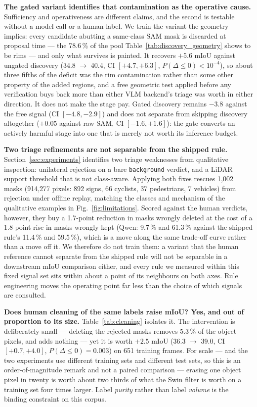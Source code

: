 \documentclass[conference]{IEEEtran}
\begin{document}
\textbf{The gated variant identifies that contamination as the operative cause.}
Sufficiency and operativeness are different claims, and the second is testable without a model call
or a human label. We train the variant the geometry implies: every candidate abutting a same-class
SAM mask is discarded at proposal time --- the 78.6\,\% of the pool Table~\ref{tab:discovery_geometry}
shows to be rims --- and only what survives is painted.
It recovers $+5.6$ mIoU against ungated discovery (34.8 $\to$ 40.4, CI $[+4.7, +6.3]$,
$P(\Delta\leq0)<10^{-4}$), so about three fifths of the deficit was the rim contamination rather than
some other property of the added regions, and a free geometric test applied before any verification
buys back more than either VLM backend's triage was worth in either direction.
It does not make the stage pay. Gated discovery remains $-3.8$ against the free signal
(CI $[-4.8, -2.9]$) and does not separate from skipping discovery altogether ($+0.05$ against raw
SAM, CI $[-1.6, +1.6]$): the gate converts an actively harmful stage into one that is merely not
worth its inference budget.



\textbf{Two triage refinements are not separable from the shipped rule.}
Section~\ref{sec:experiments} identifies two triage weaknesses from qualitative inspection: unilateral
rejection on a bare \texttt{background} verdict, and a LiDAR support threshold that is not class-aware.
Applying both fixes rescues 1{,}002 masks (914{,}277 pixels: 892 signs, 66 cyclists, 37 pedestrians,
7 vehicles) from rejection under offline replay, matching the classes and mechanism of the qualitative
examples in Fig.~\ref{fig:limitations}. Scored against the human verdicts, however, they buy a
1.7-point reduction in masks wrongly deleted at the cost of a 1.8-point rise in masks wrongly kept
(Qwen: 9.7\,\% and 61.3\,\% against the shipped rule's 11.4\,\% and 59.5\,\%), which is a move along
the same trade-off curve rather than a move off it.
We therefore do not train them: a variant that the human reference cannot separate from the shipped
rule will not be separable in a downstream mIoU comparison either, and every rule we measured within
this fixed signal set sits within about a point of its neighbours on both axes. Rule engineering moves
the operating point far less than the choice of which signals are consulted.



\textbf{Does human cleaning of the same labels raise mIoU? Yes, and out of proportion to its size.}
Table~\ref{tab:cleaning} isolates it. The intervention is deliberately small --- deleting the rejected
masks removes 5.3\,\% of the object pixels, and adds nothing --- yet it is worth $+2.5$ mIoU
(36.3 $\to$ 39.0, CI $[+0.7, +4.0]$, $P(\Delta\leq0)=0.003$) on 651 training frames. For scale --- and
the two experiments use different training sets and different test sets, so this is an order-of-magnitude
remark and not a paired comparison --- erasing one object pixel in twenty is worth about two thirds of
what the Swin filter is worth on a training set four times larger. Label \emph{purity} rather than
label \emph{volume} is the binding constraint on this corpus.
\end{document}
